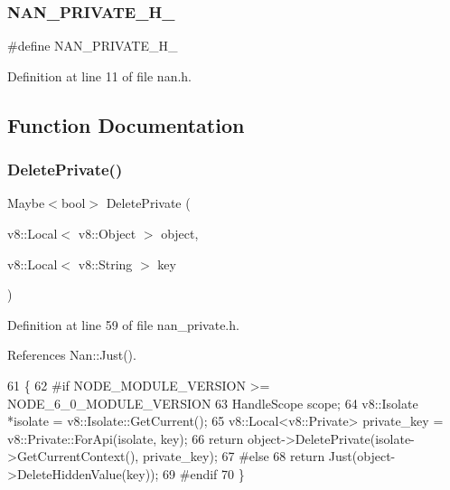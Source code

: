 \subsubsection{N\+A\+N\+\_\+\+P\+R\+I\+V\+A\+T\+E\+\_\+\+H\+\_\+}
{\footnotesize\ttfamily \#define N\+A\+N\+\_\+\+P\+R\+I\+V\+A\+T\+E\+\_\+\+H\+\_\+}



Definition at line 11 of file nan.\+h.



\subsection{Function Documentation}
\mbox{\label{nan__private_8h_a55094e1c3cfc6b2364b757bebcb8294d}} 
\subsubsection{Delete\+Private()}
{\footnotesize\ttfamily Maybe$<$bool$>$ Delete\+Private (\begin{DoxyParamCaption}\item[{v8\+::\+Local$<$ v8\+::\+Object $>$}]{object,  }\item[{v8\+::\+Local$<$ v8\+::\+String $>$}]{key }\end{DoxyParamCaption})}



Definition at line 59 of file nan\+\_\+private.\+h.



References Nan\+::\+Just().


\begin{DoxyCode}
61                            \{
62 \textcolor{preprocessor}{#if NODE\_MODULE\_VERSION >= NODE\_6\_0\_MODULE\_VERSION}
63   HandleScope scope;
64   v8::Isolate *isolate = v8::Isolate::GetCurrent();
65   v8::Local<v8::Private> private\_key = v8::Private::ForApi(isolate, key);
66   \textcolor{keywordflow}{return} \textcolor{keywordtype}{object}->DeletePrivate(isolate->GetCurrentContext(), private\_key);
67 \textcolor{preprocessor}{#else}
68   \textcolor{keywordflow}{return} Just(object->DeleteHiddenValue(key));
69 \textcolor{preprocessor}{#endif}
70 \}
\end{DoxyCode}
\mbox{\label{nan__private_8h_a40a5729e2f757a9df183fb283201d0b3}} 
